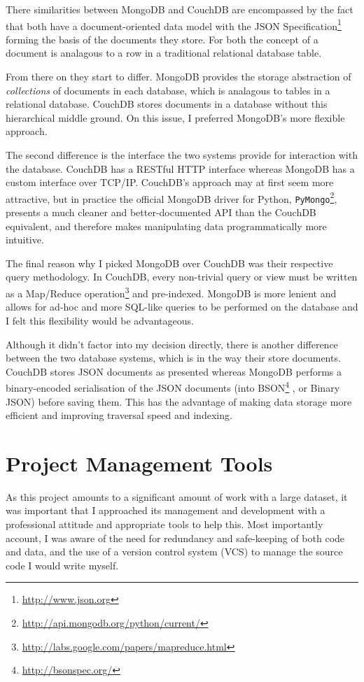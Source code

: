 \documentclass[a4paper,12pt,twoside,notitlepage]{report}
\begin{document}
There similarities between MongoDB and CouchDB are encompassed by the fact that
both have a document-oriented data model with the JSON
Specification\footnote{\url{http://www.json.org}} forming the basis of the
documents they store. For both the concept of a document is analagous to a row
in a traditional relational database table. 

From there on they start to differ. MongoDB provides the storage abstraction of
\emph{collections} of documents in each database, which is analagous to tables
in a relational database. CouchDB stores documents in a database without
this hierarchical middle ground. On this issue, I preferred MongoDB's more
flexible approach.

The second difference is the interface the two systems provide for interaction
with the database. CouchDB has a RESTful HTTP interface whereas MongoDB has a
custom interface over TCP/IP. CouchDB's approach may at first seem more
attractive, but in practice the official MongoDB driver for Python, 
\texttt{PyMongo}\footnote{\url{http://api.mongodb.org/python/current/}},
presents a much cleaner and better-documented API than the CouchDB equivalent,
and therefore makes manipulating data programmatically more intuitive.

The final reason why I picked MongoDB over CouchDB was their respective query
methodology. In CouchDB, every non-trivial query or view must be written as a
Map/Reduce
operation\footnote{\url{http://labs.google.com/papers/mapreduce.html}} and
pre-indexed. MongoDB is more lenient and allows for ad-hoc and more SQL-like
queries to be performed on the database and I felt this flexibility would be
advantageous.

Although it didn't factor into my decision directly, there is another
difference between the two database systems, which is in the way their store
documents. CouchDB stores JSON documents as presented whereas MongoDB performs a
binary-encoded serialisation of the JSON documents (into
BSON\footnote{\url{http://bsonspec.org/}} , or Binary JSON) before saving them.
This has the advantage of making data storage more efficient and improving
traversal speed and indexing.

\section{Project Management Tools}

As this project amounts to a significant amount of work with a large dataset, it
was important that I approached its management and development with a
professional attitude and appropriate tools to help this. Most
importantly account, I was aware of the need for redundancy and safe-keeping of
both code and data, and the use of a version control system (VCS) to manage the
source code I would write myself.
\end{document}
